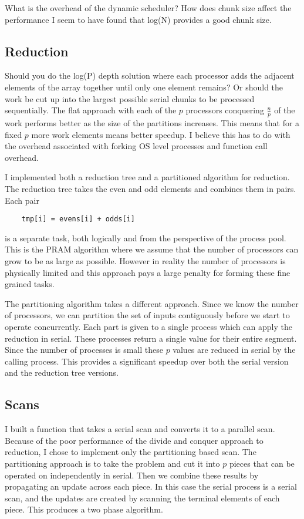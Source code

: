 \documentclass[]{IEEEtran}
\begin{document}
What is the overhead of the dynamic scheduler? How does chunk size
affect the performance I seem to have found that log(N) provides a good
chunk size.

\subsection{Reduction}

Should you do the log(P) depth solution where each processor adds the
adjacent elements of the array together until only one element remains?
Or should the work be cut up into the largest possible serial chunks to
be processed sequentially. The flat approach with each of the $p$
processors conquering $\frac{n}{p}$ of the work performs better as the
size of the partitions increases. This means that for a fixed $p$ more
work elements means better speedup. I believe this has to do with the
overhead associated with forking OS level processes and function call
overhead.

I implemented both a reduction tree and a partitioned algorithm for
reduction. The reduction tree takes the even and odd elements and
combines them in pairs. Each pair

\begin{verbatim}
    tmp[i] = evens[i] + odds[i]
\end{verbatim}
is a separate task, both logically and from the perspective of the
process pool. This is the PRAM algorithm where we assume that the number
of processors can grow to be as large as possible. However in reality
the number of processors is physically limited and this approach pays a
large penalty for forming these fine grained tasks.

The partitioning algorithm takes a different approach. Since we know the
number of processors, we can partition the set of inputs contiguously
before we start to operate concurrently. Each part is given to a single
process which can apply the reduction in serial. These processes return
a single value for their entire segment. Since the number of processes
is small these $p$ values are reduced in serial by the calling process.
This provides a significant speedup over both the serial version and the
reduction tree versions.

\subsection{Scans}

I built a function that takes a serial scan and converts it to a
parallel scan. Because of the poor performance of the divide and conquer
approach to reduction, I chose to implement only the partitioning based
scan. The partitioning approach is to take the problem and cut it into
$p$ pieces that can be operated on independently in serial. Then we
combine these results by propagating an update across each piece. In
this case the serial process is a serial scan, and the updates are
created by scanning the terminal elements of each piece. This produces a
two phase algorithm.
\end{document}

